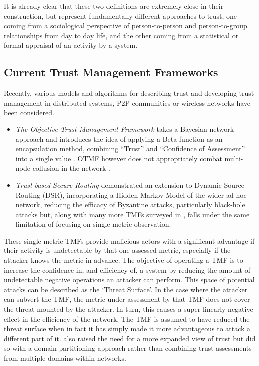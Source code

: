\documentclass[runningheads,a4paper]{llncs}
\begin{document}
It is already clear that these two definitions are extremely close in their construction, but represent fundamentally different approaches to trust, one coming from a sociological perspective of person-to-person and person-to-group relationships from day to day life, and the other coming from a statistical or formal appraisal of an activity by a system.

\subsection{Current Trust Management Frameworks}

Recently, various models and algorithms for describing trust and developing trust management in distributed systems, P2P communities or wireless networks have been considered.

\begin{itemize}
  \item \emph{The Objective Trust Management Framework} takes a Bayesian network approach and introduces the idea of applying a Beta function as an encapsulation method, combining ``Trust'' and ``Confidence of Assessment'' into a single value \cite{Li2008}. 
OTMF however does not appropriately combat multi-node-collusion in the network \cite{Cho2011}. 

  \item \emph{Trust-based Secure Routing \cite{Moe2008a}} demonstrated an extension to Dynamic Source Routing (DSR), incorporating a Hidden Markov Model of the wider ad-hoc network, reducing the efficacy of Byzantine attacks, particularly black-hole attacks but, along with many more TMFs surveyed in \cite{Cho2011}, falls under the same limitation of focusing on single metric observation. 
\end{itemize}

These single metric TMFs provide malicious actors with a significant advantage if their activity is undetectable by that one assessed metric, especially if the attacker knows the metric in advance. 
The objective of operating a TMF is to increase the confidence in, and efficiency of, a system by reducing the amount of undetectable negative operations an attacker can perform. 
This space of potential attacks can be described as the ‘Threat Surface’. 
In the case where the attacker can subvert the TMF, the metric under assessment by that TMF does not cover the threat mounted by the attacker. 
In turn, this causes a super-linearly negative effect in the efficiency of the network. 
The TMF is assumed to have reduced the threat surface when in fact it has simply made it more advantageous to attack a different part of it.  
\cite{Huang2010a} also raised the need for a more expanded view of trust but did so with a domain-partitioning approach rather than combining trust assessments from multiple domains within networks. 
\end{document}
